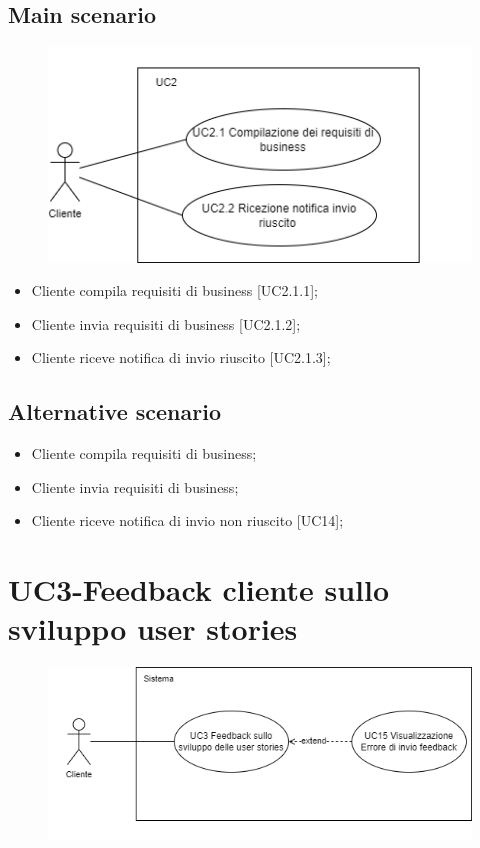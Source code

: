 \documentclass{article}
\begin{document}
     \subsection*{Main scenario}
         \begin{figure}[h]
            \centering
            \includegraphics{./imgUML/UC2-zoom.png}
            \label{fig:immagine}
        \end{figure}
        \begin{itemize}
            \item Cliente compila requisiti di business [UC2.1.1];
            \item Cliente invia requisiti di business [UC2.1.2];
            \item Cliente riceve notifica di invio riuscito [UC2.1.3];
        \end{itemize}
     \subsection*{Alternative scenario}
        \begin{itemize}
            \item Cliente compila requisiti di business;
            \item Cliente invia requisiti di business;
            \item Cliente riceve notifica di invio non riuscito [UC14];
        \end{itemize}

\section{UC3-Feedback cliente sullo sviluppo user stories}
    \begin{figure}[h]
      \centering
      \includegraphics{./imgUML/UC3.png}
      \label{fig:immagine}
    \end{figure}
    
\end{document}
